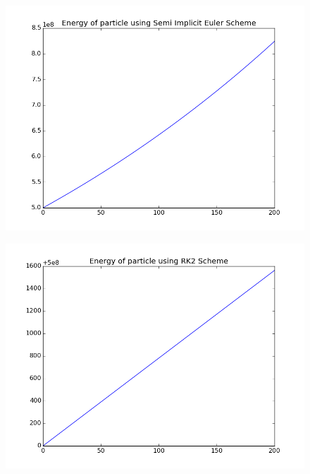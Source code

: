 \documentclass[11pt, a4paper]{article}
\begin{document}
\begin{figure}[H]
 \centering
 \includegraphics[width = \textwidth]{q1_energy_euler2.png}
\end{figure}
\begin{figure}[H]
 \centering
 \includegraphics[width = \textwidth]{q1_energy_RK2.png}
\end{figure}
\end{document}
